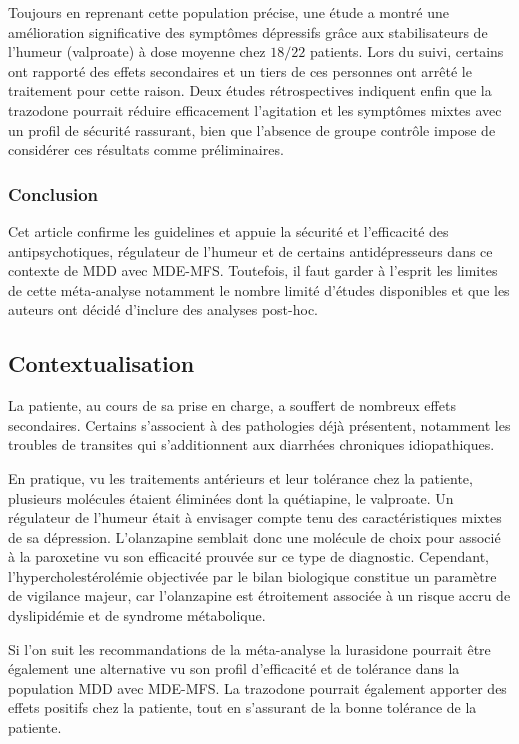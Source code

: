 \begin{itemize}[label=\textbullet]
    Toujours en reprenant cette population précise, une étude a montré une amélioration significative des symptômes dépressifs grâce aux stabilisateurs de l’humeur (valproate) à dose moyenne chez $18/22$ patients. Lors du suivi, certains ont rapporté des effets secondaires et un tiers de ces personnes ont arrêté le traitement pour cette raison. Deux études rétrospectives indiquent enfin que la trazodone pourrait réduire efficacement l’agitation et les symptômes mixtes avec un profil de sécurité rassurant, bien que l’absence de groupe contrôle impose de considérer ces résultats comme préliminaires.
\end{itemize}
 
\subsubsection{Conclusion} 
 
Cet article confirme les guidelines et appuie la sécurité et l’efficacité des antipsychotiques, régulateur de l’humeur et de certains antidépresseurs dans ce contexte de MDD avec MDE-MFS. Toutefois, il faut garder à l’esprit les limites de cette méta-analyse notamment le nombre limité d’études disponibles et que les auteurs ont décidé d’inclure des analyses post-hoc. 
 
\subsection{Contextualisation}
La patiente, au cours de sa prise en charge, a souffert de nombreux effets secondaires. Certains s’associent à des pathologies déjà présentent, notamment les troubles de transites qui s’additionnent aux diarrhées chroniques idiopathiques. 

En pratique, vu les traitements antérieurs et leur tolérance chez la patiente, plusieurs molécules étaient éliminées dont la quétiapine, le valproate. Un régulateur de l’humeur était à envisager compte tenu des caractéristiques mixtes de sa dépression. L'olanzapine semblait donc une molécule de choix pour associé à la paroxetine vu son efficacité prouvée sur ce type de diagnostic. Cependant, l'hypercholestérolémie objectivée par le bilan biologique constitue un paramètre de vigilance majeur, car l'olanzapine est étroitement associée à un risque accru de dyslipidémie et de syndrome métabolique.

Si l’on suit les recommandations de la méta-analyse la lurasidone pourrait être également une alternative vu son profil d’efficacité et de tolérance dans la population MDD avec MDE-MFS. La trazodone pourrait également apporter des effets positifs chez la patiente, tout en s’assurant de la bonne tolérance de la patiente.

